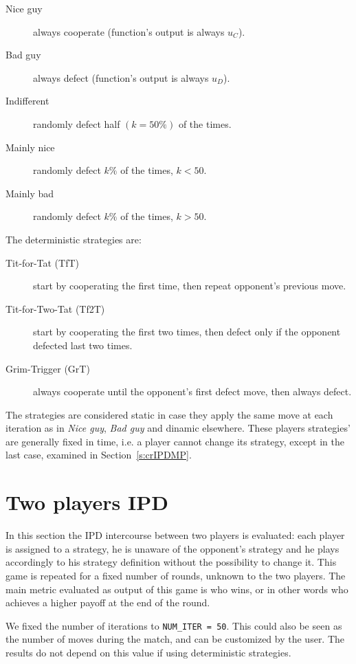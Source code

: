 \documentclass[journal,a4paper,10pt,twoside]{IEEEtran} %
\begin{document}
\begin{description}
    \item[Nice guy] always cooperate (function's output is always $u_C$).
    \item[Bad guy] always defect (function's output is always $u_D$).
    \item[Indifferent] randomly defect half $(k=50\%)$ of the times.
    \item[Mainly nice] randomly defect $k\%$ of the times, $k<50$.%
    \item[Mainly bad] randomly defect $k\%$ of the times, $k>50$.%
\end{description}

The deterministic strategies are:
\begin{description}
    \item[Tit-for-Tat (TfT)] start by cooperating the first time, then repeat opponent's previous move.
    \item[Tit-for-Two-Tat (Tf2T)] start by cooperating the first two times, then defect only if the opponent defected last two times.
    \item[Grim-Trigger (GrT)] always cooperate until the opponent's first defect move, then always defect. 
\end{description}

The strategies are considered static in case they apply the same move at each iteration as in \textit{Nice guy}, \textit{Bad guy} and dinamic elsewhere.
These players strategies' are generally fixed in time, i.e. a player cannot change its strategy, except in the last case, examined in Section~\ref{s:crIPDMP}.

\section{Two players IPD} \label{s:IPD2P}
In this section the IPD intercourse between two players is evaluated: each player is assigned to a strategy, he is unaware of the opponent's strategy and he plays accordingly to his strategy definition without the possibility to change it. This game is repeated for a fixed number of rounds, unknown to the two players. The main metric evaluated as output of this game is who wins, or in other words who achieves a higher payoff at the end of the round.

We fixed the number of iterations to \texttt{NUM\_ITER = 50}. This could also be seen as the number of moves during the match, and can be customized by the user. The results do not depend on this value if using deterministic strategies.
\end{document}
